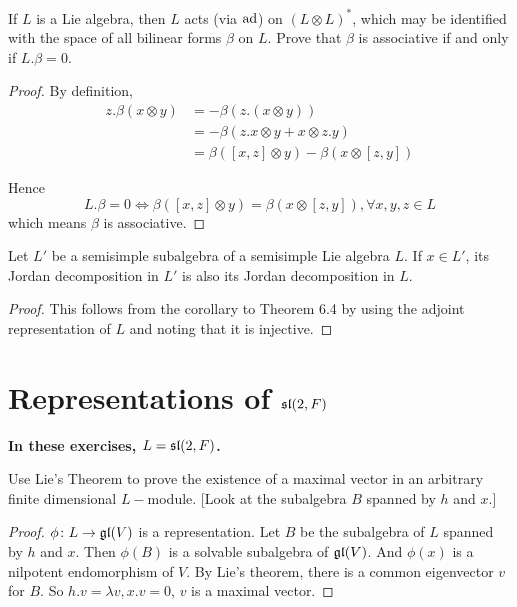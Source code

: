 \begin{ex}
  If $L$ is a Lie algebra, then $L$ acts (via $\ad$) on $(L\otimes L)^{\ast}$, which may be identified with the space of all bilinear forms $\beta$ on $L$. Prove that $\beta$ is associative if and only if $L.\beta = 0$.
\end{ex}
\begin{proof}
  By definition,
  \begin{align*}
    z.\beta(x\otimes y) &= -\beta(z.(x\otimes y)) \\
     &= -\beta(z.x\otimes y+x\otimes z.y) \\
     &= \beta([x,z]\otimes y)-\beta(x\otimes[z,y])
  \end{align*}

  Hence
  \begin{equation*}
    L.\beta=0 \iff \beta([x,z]\otimes y)=\beta(x\otimes[z,y]), \forall x,y,z\in L
  \end{equation*}
  which means $\beta$ is associative.
\end{proof}

\begin{ex}\label{6.9}
  Let $L'$ be a semisimple subalgebra of a semisimple Lie algebra $L$. If $x \in L'$, its Jordan decomposition in $L'$ is also its Jordan decomposition in $L$.
\end{ex}
\begin{proof}
  This follows from the corollary to Theorem 6.4 by using the adjoint representation of $L$ and noting that it is injective.
\end{proof}

\section{Representations of $\sl(2,F)$}
\textbf{In these exercises, $L = \sl(2,F)$.}



\begin{ex}
  Use Lie's Theorem to prove the existence of a maximal vector in an arbitrary finite dimensional $L-$module. [Look at the subalgebra $B$ spanned by $h$ and $x$.]
\end{ex}
\begin{proof}
  $\phi\colon L \to \gl(V)$ is a representation. Let $B$ be the subalgebra of $L$ spanned by $h$ and $x$. Then $\phi(B)$ is a solvable subalgebra of $\gl(V)$. And $\phi(x)$ is a nilpotent endomorphism of $V$. By Lie's theorem, there is a common eigenvector $v$ for $B$. So $h.v = \lambda v, x.v = 0$, $v$ is a maximal vector.
\end{proof}

